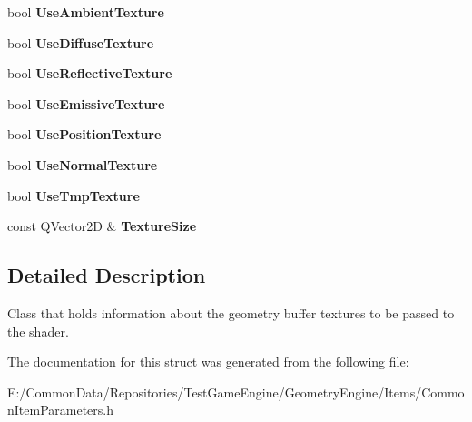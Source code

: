 \begin{DoxyCompactItemize}
bool {\bfseries Use\+Ambient\+Texture}
\item 
\mbox{\label{struct_geometry_engine_1_1_g_buffer_texture_info_a6a2826cc837bacdd679af056d98d55b4}} 
bool {\bfseries Use\+Diffuse\+Texture}
\item 
\mbox{\label{struct_geometry_engine_1_1_g_buffer_texture_info_a58dfdab3c9b2015639b6b6734f447817}} 
bool {\bfseries Use\+Reflective\+Texture}
\item 
\mbox{\label{struct_geometry_engine_1_1_g_buffer_texture_info_a839a370b51863dcede4ade7aa0c3bcc3}} 
bool {\bfseries Use\+Emissive\+Texture}
\item 
\mbox{\label{struct_geometry_engine_1_1_g_buffer_texture_info_af7857a51710f4de7a7b23708f1cef12c}} 
bool {\bfseries Use\+Position\+Texture}
\item 
\mbox{\label{struct_geometry_engine_1_1_g_buffer_texture_info_aef8eef842f157dc28cb5aec17f6ef53f}} 
bool {\bfseries Use\+Normal\+Texture}
\item 
\mbox{\label{struct_geometry_engine_1_1_g_buffer_texture_info_a1edf755a62c1455819a07b5b48bc9458}} 
bool {\bfseries Use\+Tmp\+Texture}
\item 
\mbox{\label{struct_geometry_engine_1_1_g_buffer_texture_info_a3350a95b39b831c2d8196ff7f1239f33}} 
const Q\+Vector2D \& {\bfseries Texture\+Size}
\end{DoxyCompactItemize}


\subsection{Detailed Description}
Class that holds information about the geometry buffer textures to be passed to the shader. 

The documentation for this struct was generated from the following file\+:\begin{DoxyCompactItemize}
\item 
E\+:/\+Common\+Data/\+Repositories/\+Test\+Game\+Engine/\+Geometry\+Engine/\+Items/Common\+Item\+Parameters.\+h\end{DoxyCompactItemize}
